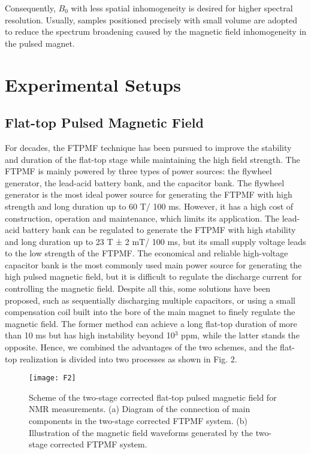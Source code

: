 \documentclass[lettersize,journal]{IEEEtran}
\begin{document}
Consequently, $B_0$ with less spatial inhomogeneity is desired for higher spectral resolution. Usually, samples positioned precisely with small volume are adopted to reduce the spectrum broadening caused by the magnetic field inhomogeneity in the pulsed magnet.

\section{Experimental Setups}
\subsection{Flat-top Pulsed Magnetic Field}
For decades, the FTPMF technique has been pursued to improve the stability and duration of the flat-top stage while maintaining the high field strength\cite{ref26,ref27,ref28,ref29,ref30,ref31,ref32}. The FTPMF is mainly powered by three types of power sources: the flywheel generator, the lead-acid battery bank, and the capacitor bank. The flywheel generator is the most ideal power source for generating the FTPMF with high strength and long duration up to 60 T/ 100 ms\cite{ref30}. However, it has a high cost of construction, operation and maintenance, which limits its application. The lead-acid battery bank can be regulated to generate the FTPMF with high stability and long duration up to 23 T ± 2 mT/ 100 ms\cite{ref31}, but its small supply voltage leads to the low strength of the FTPMF. The economical and reliable high-voltage capacitor bank is the most commonly used main power source for generating the high pulsed magnetic field, but it is difficult to regulate the discharge current for controlling the magnetic field. Despite all this, some solutions have been proposed, such as sequentially discharging multiple capacitors\cite{ref27,ref28,ref32}, or using a small compensation coil built into the bore of the main magnet to finely regulate the magnetic field\cite{ref29}. The former method can achieve a long flat-top duration of more than 10 ms but has high instability beyond 10$^3$ ppm, while the latter stands the opposite. Hence, we combined the advantages of the two schemes, and the flat-top realization is divided into two processes as shown in Fig. 2.

\begin{figure}[h]
\centering
\texttt{[image: F2]}
\caption{Scheme of the two-stage corrected flat-top pulsed magnetic field for NMR measurements. (a) Diagram of the connection of main components in the two-stage corrected FTPMF system. (b) Illustration of the magnetic field waveforms generated by the two-stage corrected FTPMF system.}
\end{figure}
\end{document}
